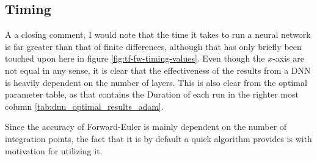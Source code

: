 \subsection{Timing}
A a closing comment, I would note that the time it takes to run a neural network is far greater than that of finite differences, although that has only briefly been touched upon here in figure \ref{fig:tf-fw-timing-values}. Even though the $x$-axis are not equal in any sense, it is clear that the effectiveness of the results from a DNN is heavily dependent on the number of layers. This is also clear from the optimal parameter table, as that contains the Duration of each run in the righter most column \ref{tab:dnn_optimal_results_adam}. 

Since the accuracy of Forward-Euler is mainly dependent on the number of integration points, the fact that it is by default a quick algorithm provides is with motivation for utilizing it.